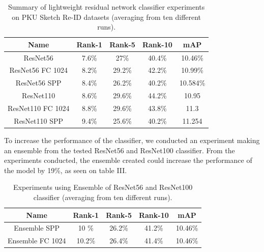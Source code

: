\documentclass[conference]{IEEEtran}
\begin{document}
	\begin{table}[h!]
		\begin{center}
			\begin{tabular}{|c|c|c|c|c|}
				\hline
				\textbf{Name} & \textbf{Rank-1} & \textbf{Rank-5} & \textbf{Rank-10} & \textbf{mAP} \\ \hline
				ResNet56 & 7.6\% & 27\% & 40.4\% & 10.46\%\\ \hline
				ResNet56 FC 1024 & 8.2\% & 29.2\% & 42.2\% & 10.99\%\\ \hline
				ResNet56 SPP & 8.4\% & 26.2\% & 40.2\% & 10.584\%\\ \hline
				ResNet110& 8.6\% & 29.6\% & 44.2\% & 10.95 \\ \hline
				ResNet110 FC 1024& 8.8\% & 29.6\% & 43.8\% & 11.3 \\ \hline
				ResNet110 SPP& 9.4\% & 25.6\% & 40.2\% & 11.254 \\ \hline
			\end{tabular}
		\end{center}
		\vspace{1ex}
		\caption{Summary of lightweight residual network classifier experiments on PKU Sketch Re-ID datasets (averaging from ten different runs).}
		\label{tabel:2}
	\end{table}
	
	To increase the performance of the classifier, we conducted an experiment making an ensemble from the tested ResNet56 and ResNet100 classifier. From the experiments conducted, the ensemble created could increase the performance of the model by 19\%, as seen on table III.
	
	\begin{table}[h!]
		\begin{center}
			\begin{tabular}{|c|c|c|c|c|}
				\hline
				\textbf{Name} & \textbf{Rank-1} & \textbf{Rank-5} & \textbf{Rank-10} & \textbf{mAP} \\ \hline
				Ensemble SPP & 10 \% & 26.2\% & 41.2\% & 10.46\%\\ \hline
				Ensemble FC 1024 & 10.2\% & 26.4\% & 41.4\% & 10.46\%\\ \hline
			\end{tabular}
		\end{center}
		\vspace{1ex}
		\caption{Experiments using Ensemble of ResNet56 and ResNet100 classifier (averaging from ten different runs).}
		\label{tabel:2}
	\end{table}
	
\end{document}
